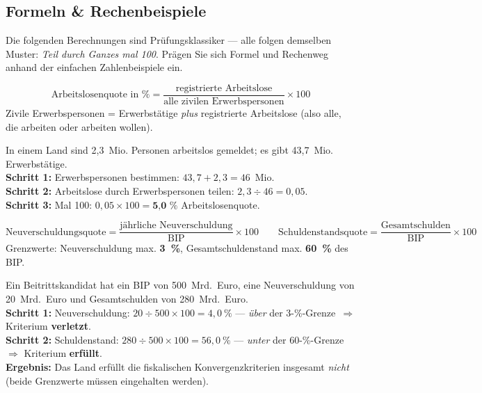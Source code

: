 \documentclass[11pt, a4paper]{article}
\begin{document}
\subsection{Formeln \& Rechenbeispiele}

Die folgenden Berechnungen sind Prüfungsklassiker --- alle folgen demselben Muster:
\emph{Teil durch Ganzes mal 100}. Prägen Sie sich Formel und Rechenweg anhand der
einfachen Zahlenbeispiele ein.

\begin{merksatz}[title={\bfseries Formel: Arbeitslosenquote}]
\[
\text{Arbeitslosenquote in \%} =
\frac{\text{registrierte Arbeitslose}}{\text{alle zivilen Erwerbspersonen}} \times 100
\]
Zivile Erwerbspersonen = Erwerbstätige \emph{plus} registrierte Arbeitslose (also alle,
die arbeiten oder arbeiten wollen).
\end{merksatz}

\begin{beispiel}
In einem Land sind 2,3~Mio. Personen arbeitslos gemeldet; es gibt 43,7~Mio. Erwerbstätige.\\[0.3em]
\textbf{Schritt 1:} Erwerbspersonen bestimmen: $43{,}7 + 2{,}3 = 46$~Mio.\\
\textbf{Schritt 2:} Arbeitslose durch Erwerbspersonen teilen: $2{,}3 \div 46 = 0{,}05$.\\
\textbf{Schritt 3:} Mal 100: $0{,}05 \times 100 = \textbf{5{,}0~\%}$ Arbeitslosenquote.
\end{beispiel}

\begin{merksatz}[title={\bfseries Anwendung: Konvergenzkriterien nachrechnen (3~\% / 60~\%)}]
\[
\text{Neuverschuldungsquote} = \frac{\text{jährliche Neuverschuldung}}{\text{BIP}} \times 100
\qquad
\text{Schuldenstandsquote} = \frac{\text{Gesamtschulden}}{\text{BIP}} \times 100
\]
Grenzwerte: Neuverschuldung max. \textbf{3~\%}, Gesamtschuldenstand max. \textbf{60~\%}
des BIP.
\end{merksatz}

\begin{beispiel}
Ein Beitrittskandidat hat ein BIP von 500~Mrd.~Euro, eine Neuverschuldung von
20~Mrd.~Euro und Gesamtschulden von 280~Mrd.~Euro.\\[0.3em]
\textbf{Schritt 1:} Neuverschuldung: $20 \div 500 \times 100 = 4{,}0~\%$ ---
\emph{über} der 3-\%-Grenze~$\Rightarrow$ Kriterium \textbf{verletzt}.\\
\textbf{Schritt 2:} Schuldenstand: $280 \div 500 \times 100 = 56{,}0~\%$ ---
\emph{unter} der 60-\%-Grenze~$\Rightarrow$ Kriterium \textbf{erfüllt}.\\
\textbf{Ergebnis:} Das Land erfüllt die fiskalischen Konvergenzkriterien insgesamt
\emph{nicht} (beide Grenzwerte müssen eingehalten werden).
\end{beispiel}
\end{document}
